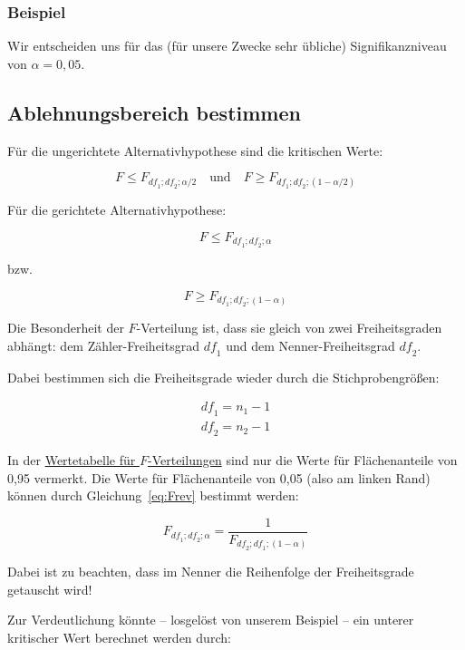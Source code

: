 \documentclass[
  11pt,
  ngerman,
  a4paper,
]{report}
\begin{document}
\hypertarget{beispiel-19}{%
\subsubsection{Beispiel}\label{beispiel-19}}

Wir entscheiden uns für das (für unsere Zwecke sehr übliche) Signifikanzniveau von \(\alpha=0{,}05\).

\hypertarget{ablehnungsbereich-bestimmen-3}{%
\subsection{Ablehnungsbereich bestimmen}\label{ablehnungsbereich-bestimmen-3}}

Für die ungerichtete Alternativhypothese sind die kritischen Werte:

\[
F \leq F_{\mathit{df}_1;\mathit{df}_2;\alpha/2} \quad \textrm{und} \quad F \geq F_{\mathit{df}_1;\mathit{df}_2;(1-\alpha/2)}
\label{eq:kritFu}
\]

Für die gerichtete Alternativhypothese:

\[
F \leq F_{\mathit{df}_1;\mathit{df}_2;\alpha}
\label{eq:kritFl}
\]

bzw.

\[
F \geq F_{\mathit{df}_1;\mathit{df}_2;(1-\alpha)}
\label{eq:kritFg}
\]

Die Besonderheit der \(F\)-Verteilung ist, dass sie gleich von zwei Freiheitsgraden abhängt: dem Zähler-Freiheitsgrad \(\mathit{df}_1\) und dem Nenner-Freiheitsgrad \(\mathit{df}_2\).

Dabei bestimmen sich die Freiheitsgrade wieder durch die Stichprobengrößen:

\[
\begin{aligned}
\mathit{df}_1=n_1-1\\
\mathit{df}_2=n_2-1
\end{aligned}
\label{eq:Fdfs}
\]

In der \protect\hyperlink{tabelle-f}{Wertetabelle für \(F\)-Verteilungen} sind nur die Werte für Flächenanteile von 0,95 vermerkt. Die Werte für Flächenanteile von 0,05 (also am linken Rand) können durch Gleichung~\eqref{eq:Frev} bestimmt werden:

\[
F_{\mathit{df}_1;\mathit{df}_2;\alpha}=\frac{1}{F_{\mathit{df}_2;\mathit{df}_1;(1-\alpha)}}
\label{eq:Frev}
\]

Dabei ist zu beachten, dass im Nenner die Reihenfolge der Freiheitsgrade getauscht wird!

Zur Verdeutlichung könnte -- losgelöst von unserem Beispiel -- ein unterer kritischer Wert berechnet werden durch:
\end{document}
